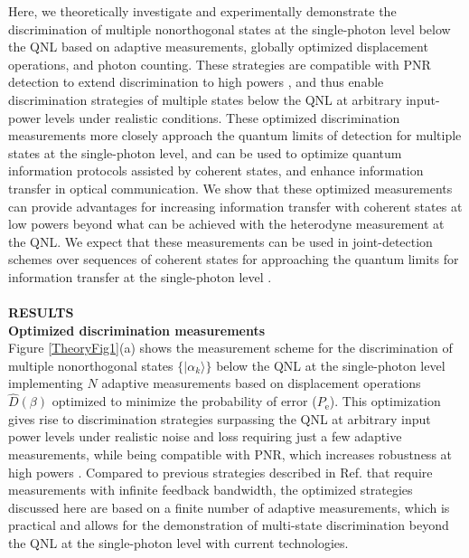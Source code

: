 \documentclass[twocolumn,pra,preprintnumbers,amsmath,amssymb,superscriptaddress,floatfix]{revtex4}%
\begin{document}
Here, we theoretically investigate and experimentally demonstrate
the discrimination of multiple nonorthogonal states at the
single-photon level below the QNL based on adaptive measurements,
globally optimized displacement operations, and photon counting.
These strategies are compatible with PNR detection to extend
discrimination to high powers \cite{becerra13, becerra15}, and thus
enable discrimination strategies of multiple states below the QNL at
arbitrary input-power levels under realistic conditions. These
optimized discrimination measurements more closely approach the quantum
limits of detection for multiple states at the single-photon level,
and can be used to optimize quantum information protocols assisted
by coherent states, and enhance
information transfer in optical communication. We show that these
optimized measurements can provide advantages for increasing
information transfer with coherent states at low powers \cite{lee16} beyond what
can be achieved with the heterodyne measurement at the QNL. We
expect that these measurements can be used
in joint-detection schemes over sequences of coherent states for approaching the quantum
limits for information transfer at the single-photon level
\cite{rosati16}.
\\\\
\noindent
\textbf{RESULTS}
\\
\textbf{Optimized discrimination measurements} \\
Figure \ref{TheoryFig1}(a) shows the measurement scheme for the
discrimination of multiple nonorthogonal states
$\{|\alpha_{k}\rangle\}$ below the QNL at the single-photon level
implementing $N$ adaptive measurements based on displacement
operations $\hat{D}(\beta)$ optimized to minimize the probability of
error ($P_{\textrm{e}}$). This optimization gives rise to discrimination
strategies surpassing the QNL at arbitrary input power levels under
realistic noise and loss requiring just a few adaptive measurements,
while being compatible with PNR, which increases robustness at high
powers \cite{becerra15}. Compared to previous strategies described
in Ref. \cite{muller15} that require measurements with infinite
feedback bandwidth, the optimized strategies discussed here are
based on a finite number of adaptive measurements, which is
practical and allows for the demonstration of multi-state
discrimination beyond the QNL at the single-photon level with
current technologies.
\end{document}
